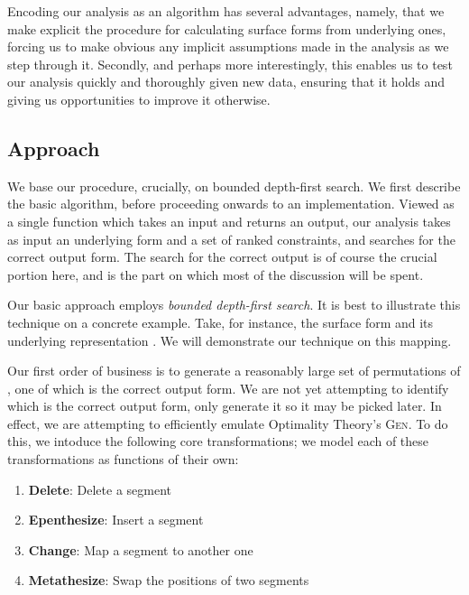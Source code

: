 \documentclass[12pt]{article}
\begin{document}
Encoding our analysis as an algorithm has several advantages, namely, that we
make explicit the procedure for calculating surface forms from underlying ones,
forcing us to make obvious any implicit assumptions made in the analysis as we
step through it. Secondly, and perhaps more interestingly, this enables us to
test our analysis quickly and thoroughly given new data, ensuring that it holds
and giving us opportunities to improve it otherwise.

\subsection{Approach}

We base our procedure, crucially, on bounded depth-first search. We first
describe the basic algorithm, before proceeding onwards to an implementation.
Viewed as a single function which takes an input and returns an output, our
analysis takes as input an underlying form and a set of ranked constraints,
and searches for the correct output form. The search for the correct output
is of course the crucial portion here, and is the part on which most of the
discussion will be spent.

Our basic approach employs \textit{bounded depth-first search}. It is best to
illustrate this technique on a concrete example. Take, for instance, the
surface form \textipa{[sol\'u]} and its underlying representation
. We will demonstrate our technique on this mapping.

Our first order of business is to generate a reasonably large set of
permutations of \textipa{[sol\'u]}, one of which is the correct output form. We
are not yet attempting to identify which is the correct output form, only
generate it so it may be picked later. In effect, we are attempting to
efficiently emulate Optimality Theory's \textsc{Gen}. To do this, we intoduce
the following core transformations; we model each of these transformations as
functions of their own:

\begin{enumerate}
    \item \textbf{Delete}: Delete a segment
    \item \textbf{Epenthesize}: Insert a segment
    \item \textbf{Change}: Map a segment to another one
    \item \textbf{Metathesize}: Swap the positions of two segments
\end{enumerate}
\end{document}

